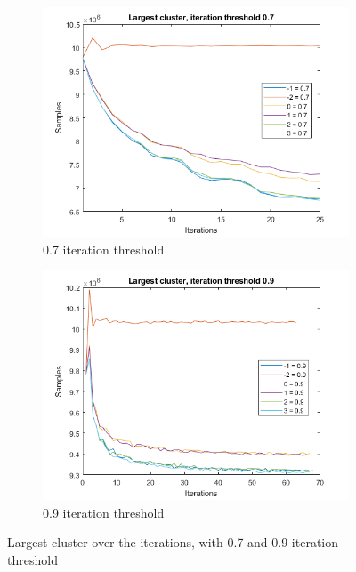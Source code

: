 \begin{figure}
    \centering
    \begin{subfigure}[b]{.45\textwidth}
        \centering
        \includegraphics[width=\textwidth]{figures/largest-0.7.png}
        \caption{0.7 iteration threshold}
        \label{sfig:iter:largestcluster0.7}
    \end{subfigure}
    \hfill
    \begin{subfigure}[b]{.45\textwidth}
        \centering
        \includegraphics[width=\textwidth]{figures/largest-0.9.png}
        \caption{0.9 iteration threshold}
        \label{sfig:iter:largestcluster0.9}
    \end{subfigure}
    \caption{Largest cluster over the iterations, with 0.7 and 0.9 iteration threshold}
    \label{fig:iter:largestcluster0.70.9}
\end{figure}

